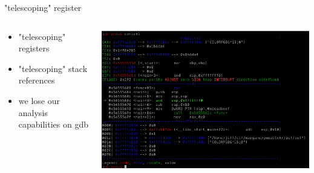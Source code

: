 \documentclass[10pt,pdf,utf8,english,compress,hyperref={unicode}]{beamer}
\begin{document}
\begin{frame}{"telescoping" register}
	\begin{columns}
		\begin{column}{.3\textwidth}
			\begin{itemize}
				\item "telescoping" registers
				\item "telescoping" stack references
				\item we lose our analysis capabilities on gdb
			\end{itemize}
		\end{column}
		\begin{column}{.7\textwidth}
			\includegraphics[width=\textwidth]{crimages/peda_context.png}
		\end{column}
	\end{columns}
\end{frame}
\end{document}
